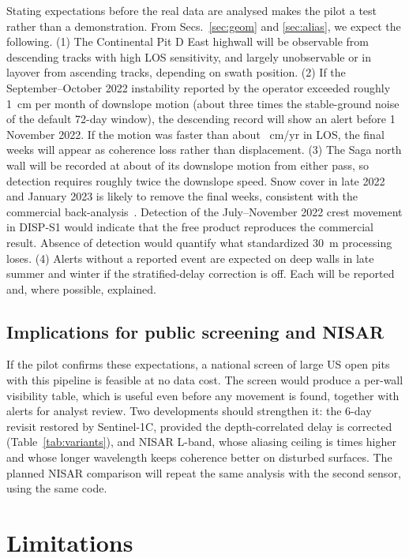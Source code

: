 \documentclass[aps,prd,twocolumn,superscriptaddress,nofootinbib,floatfix,preprintnumbers,10pt]{revtex4-2}
\begin{document}
Stating expectations before the real data are analysed makes the pilot a test rather than a demonstration. From Secs.~\ref{sec:geom} and \ref{sec:alias}, we expect the following. (1) The Continental Pit D East highwall will be observable from descending tracks with high LOS sensitivity, and largely unobservable or in layover from ascending tracks, depending on swath position. (2) If the September--October 2022 instability reported by the operator exceeded roughly 1~cm per month of downslope motion (about three times the stable-ground noise of the default 72-day window), the descending record will show an alert before 1 November 2022. If the motion was faster than about \AliasTwelve{}~cm/yr in LOS, the final weeks will appear as coherence loss rather than displacement. (3) The Saga north wall will be recorded at about \SagaMid{} of its downslope motion from either pass, so detection requires roughly twice the downslope speed. Snow cover in late 2022 and January 2023 is likely to remove the final weeks, consistent with the commercial back-analysis~\cite{Bourgeois2024}. Detection of the July--November 2022 crest movement in DISP-S1 would indicate that the free product reproduces the commercial result. Absence of detection would quantify what standardized 30~m processing loses. (4) Alerts without a reported event are expected on deep walls in late summer and winter if the stratified-delay correction is off. Each will be reported and, where possible, explained.

\subsection{Implications for public screening and NISAR}

If the pilot confirms these expectations, a national screen of large US open pits with this pipeline is feasible at no data cost. The screen would produce a per-wall visibility table, which is useful even before any movement is found, together with alerts for analyst review. Two developments should strengthen it: the 6-day revisit restored by Sentinel-1C, provided the depth-correlated delay is corrected (Table~\ref{tab:variants}), and NISAR L-band, whose aliasing ceiling is \AliasRatio{} times higher and whose longer wavelength keeps coherence better on disturbed surfaces. The planned NISAR comparison will repeat the same analysis with the second sensor, using the same code.

\section{Limitations}\label{sec:limits}
\end{document}
